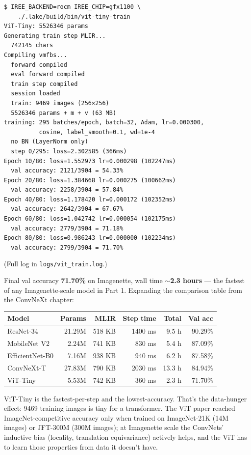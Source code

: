 \begin{verbatim}
$ IREE_BACKEND=rocm IREE_CHIP=gfx1100 \
    ./.lake/build/bin/vit-tiny-train
ViT-Tiny: 5526346 params
Generating train step MLIR...
  742145 chars
Compiling vmfbs...
  forward compiled
  eval forward compiled
  train step compiled
  session loaded
  train: 9469 images (256×256)
  5526346 params + m + v (63 MB)
training: 295 batches/epoch, batch=32, Adam, lr=0.000300,
          cosine, label_smooth=0.1, wd=1e-4
  no BN (LayerNorm only)
  step 0/295: loss=2.302585 (366ms)
Epoch 10/80: loss=1.552973 lr=0.000298 (102247ms)
  val accuracy: 2121/3904 = 54.33%
Epoch 20/80: loss=1.384668 lr=0.000275 (100662ms)
  val accuracy: 2258/3904 = 57.84%
Epoch 40/80: loss=1.178420 lr=0.000172 (102352ms)
  val accuracy: 2642/3904 = 67.67%
Epoch 60/80: loss=1.042742 lr=0.000054 (102175ms)
  val accuracy: 2779/3904 = 71.18%
Epoch 80/80: loss=0.986243 lr=0.000000 (102234ms)
  val accuracy: 2799/3904 = 71.70%
\end{verbatim}

(Full log in \texttt{logs/vit\_train.log}.)

Final val accuracy \textbf{71.70\%} on Imagenette, wall time
\textbf{$\sim$2.3 hours} --- the fastest of any Imagenette-scale
model in Part 1. Expanding the comparison table from the
ConvNeXt chapter:

\begin{center}
\begin{tabular}{l r r r r r}
\hline
Model            & Params  & MLIR     & Step time & Total   & Val acc \\
\hline
ResNet-34        & 21.29M  & 518 KB   & 1400 ms   & 9.5 h   & 90.29\% \\
MobileNet V2     &  2.24M  & 741 KB   &  830 ms   & 5.4 h   & 87.09\% \\
EfficientNet-B0  &  7.16M  & 938 KB   &  940 ms   & 6.2 h   & 87.58\% \\
ConvNeXt-T       & 27.83M  & 790 KB   & 2030 ms   & 13.3 h  & 84.94\% \\
ViT-Tiny         &  5.53M  & 742 KB   &  360 ms   & 2.3 h   & 71.70\% \\
\hline
\end{tabular}
\end{center}

ViT-Tiny is the fastest-per-step and the lowest-accuracy. That's
the data-hunger effect: 9469 training images is tiny for a
transformer. The ViT paper reached ImageNet-competitive accuracy
only when trained on ImageNet-21K (14M images) or JFT-300M (300M
images); at Imagenette scale the ConvNets' inductive bias (locality,
translation equivariance) actively helps, and the ViT has to learn
those properties from data it doesn't have.

